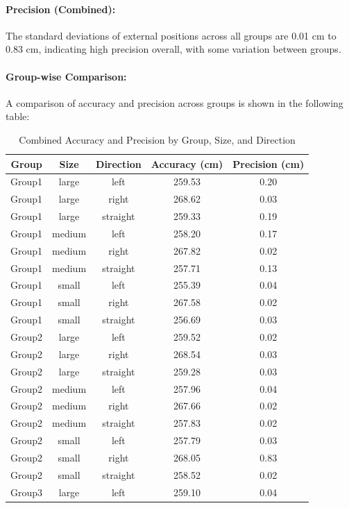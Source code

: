 \documentclass{article}
\begin{document}
\paragraph{Precision (Combined):}
The standard deviations of external positions across all groups are 0.01 cm to 0.83 cm, indicating high precision overall, with some variation between groups.

\paragraph{Group-wise Comparison:}
A comparison of accuracy and precision across groups is shown in the following table:

\begin{table}[H]
\centering
\caption{Combined Accuracy and Precision by Group, Size, and Direction}
\label{tab:combined_stats}
\begin{tabular}{|c|c|c|c|c|}
\hline
Group & Size & Direction & Accuracy (cm) & Precision (cm) \\
\hline
Group1 & large & left & 259.53 & 0.20 \\
Group1 & large & right & 268.62 & 0.03 \\
Group1 & large & straight & 259.33 & 0.19 \\
Group1 & medium & left & 258.20 & 0.17 \\
Group1 & medium & right & 267.82 & 0.02 \\
Group1 & medium & straight & 257.71 & 0.13 \\
Group1 & small & left & 255.39 & 0.04 \\
Group1 & small & right & 267.58 & 0.02 \\
Group1 & small & straight & 256.69 & 0.03 \\
Group2 & large & left & 259.52 & 0.02 \\
Group2 & large & right & 268.54 & 0.03 \\
Group2 & large & straight & 259.28 & 0.03 \\
Group2 & medium & left & 257.96 & 0.04 \\
Group2 & medium & right & 267.66 & 0.02 \\
Group2 & medium & straight & 257.83 & 0.02 \\
Group2 & small & left & 257.79 & 0.03 \\
Group2 & small & right & 268.05 & 0.83 \\
Group2 & small & straight & 258.52 & 0.02 \\
Group3 & large & left & 259.10 & 0.04 \\

\end{tabular}
\end{table}
\end{document}
